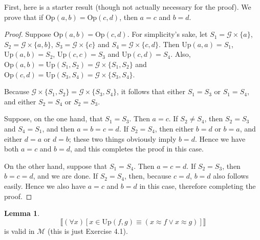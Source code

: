\documentclass{article}
\newcommand{\lbc}{\llbracket}
\newcommand{\rbc}{\rrbracket}
\theoremstyle{definition}
\newtheorem{lemma}[theorem]{Lemma}
\begin{document}
First, here is a starter result (though not actually necessary for the proof). We prove that 
if $\textrm{Op}(a,b)=\textrm{Op}(c,d)$, then $a=c$ and $b=d$.

\begin{proof}
Suppose $\textrm{Op}(a,b)=\textrm{Op}(c,d)$. For simplicity's sake, let $S_1=\mathcal{G}\times\{a\}$, 
$S_2=\mathcal{G}\times\{a,b\}$, $S_3=\mathcal{G}\times\{c\}$ and $S_4=\mathcal{G}\times\{c,d\}$. Then 
$\textrm{Up}(a,a)=S_1$, $\textrm{Up}(a,b)=S_2$, $\textrm{Up}(c,c)=S_3$ and $\textrm{Up}(c,d)=S_4$.
Also, $\textrm{Op}(a,b)=\textrm{Up}(S_1,S_2)=\mathcal{G}\times\{S_1,S_2\}$ and 
$\textrm{Op}(c,d)=\textrm{Up}(S_3,S_4)=\mathcal{G}\times\{S_3,S_4\}$.

Because $\mathcal{G}\times\{S_1,S_2\}=\mathcal{G}\times\{S_3,S_4\}$, it 
follows that either $S_1=S_3$ or $S_1=S_4$, and either $S_2=S_4$ or $S_2=S_3$. 

Suppose, on the one hand, that $S_1=S_3$. Then $a=c$. If $S_2\ne S_4$, then 
$S_2=S_3$ and $S_4=S_1$, and then $a=b=c=d$. If $S_2=S_4$, then 
either $b=d$ or $b=a$, and either $d=a$ or $d=b$; these two things obviously imply $b=d$. Hence we have both 
$a=c$ and $b=d$, and this completes the proof in this case.

On the other hand, suppose that $S_1=S_4$. Then $a=c=d$. If $S_2=S_3$, then 
$b=c=d$, and we are done. If $S_2=S_4$, then, because $c=d$, $b=d$ also follows easily. Hence we also 
have $a=c$ and $b=d$ in this case, therefore completing the proof.

\end{proof}

\begin{lemma}
\[ \lbc(\forall x)[x\in\textrm{Up}(f,g)\equiv (x\approx f\vee x\approx g)]\rbc \]
is valid in $\mathcal{M}$ (this is just Exercise 4.1).
\end{lemma}
\end{document}
